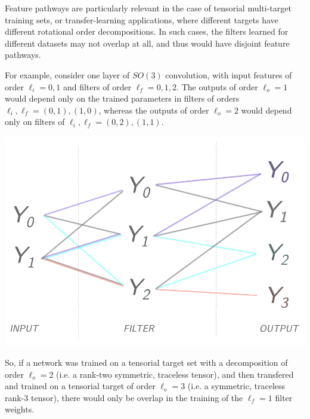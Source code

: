\documentclass[10pt,a4paper]{article}
\begin{document}
Feature pathways are particularly relevant in the case of tensorial multi-target training sets, or transfer-learning applications, where different targets have different rotational order decompositions. In such cases, the filters learned for different datasets may not overlap at all, and thus would have disjoint feature pathways. 

For example, consider one layer of $SO(3)$ convolution, with input features of order $\ell_i=0,1$ and filters of order $\ell_f = 0,1,2$. The outputs of order $\ell_{o}=1$ would depend only on the trained parameters in filters of orders $\ell_i,\ell_f = (0,1),(1,0)$, whereas the outputs of order $\ell_{o}=2$ would depend only on filters of $\ell_i,\ell_f = (0,2),(1,1)$. 
\begin{center}
\includegraphics[scale=0.5]{featurepath_ex_12.pdf}
\end{center}
So, if a network was trained on a tensorial target set with a decomposition of order $\ell_o=2$ (i.e. a rank-two symmetric, traceless tensor), and then transfered and trained on a tensorial target of order $\ell_o = 3$ (i.e. a symmetric, traceless rank-3 tensor), there would only be overlap in the training of the $\ell_f=1$ filter weights.

 

\end{document}
